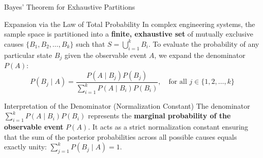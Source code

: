 \documentclass[10pt, aspectratio=169]{beamer}
\begin{document}
\begin{frame}{Bayes' Theorem for Exhaustive Partitions}
  \fontsize{7.5pt}{9pt}\selectfont
  \begin{block}{Expansion via the Law of Total Probability}
    \fontsize{7.5pt}{9pt}\selectfont
    In complex engineering systems, the sample space is partitioned into a \textbf{finite, exhaustive set} of mutually exclusive causes $\{B_1, B_2, \ldots, B_k\}$ such that $S = \bigcup_{i=1}^k B_i$. To evaluate the probability of any particular state $B_j$ given the observable event $A$, we expand the denominator $P(A)$:
    $$P(B_j \mid A) = \frac{P(A \mid B_j)P(B_j)}{\sum_{i=1}^k P(A \mid B_i)P(B_i)}, \quad \text{for all } j \in \{1, 2, \ldots, k\}$$
  \end{block}
  \vspace{-0.15cm}
  \pause
  \begin{alertblock}{Interpretation of the Denominator (Normalization Constant)}
    \fontsize{7.5pt}{9pt}\selectfont
    The denominator $\sum_{i=1}^k P(A \mid B_i)P(B_i)$ represents the \textbf{marginal probability of the observable event} $P(A)$. It acts as a strict normalization constant ensuring that the sum of the posterior probabilities across all possible causes equals exactly unity: $\sum_{j=1}^k P(B_j \mid A) = 1$.
  \end{alertblock}
\end{frame}
\end{document}
